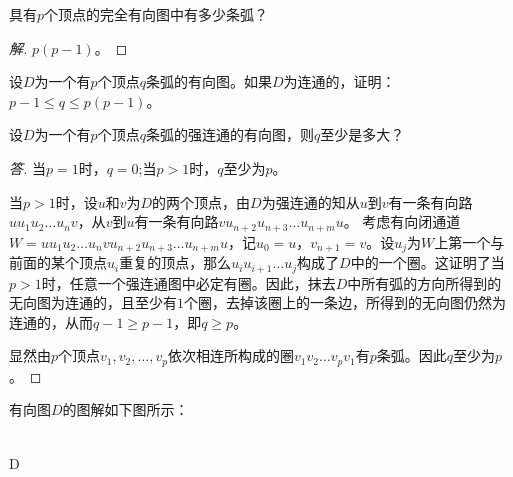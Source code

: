 \documentclass{article}
\begin{document}
\begin{CJK}{UTF8}{gbsn}
\begin{Exercise}
  具有$p$个顶点的完全有向图中有多少条弧？
\end{Exercise}
\begin{proof}[解]
  $p(p-1)$。
\end{proof}
\begin{Exercise}
  设$D$为一个有$p$个顶点$q$条弧的有向图。如果$D$为连通的，证明：$p-1\leq q \leq p(p-1)$。
\end{Exercise}
\begin{Exercise}
  设$D$为一个有$p$个顶点$q$条弧的强连通的有向图，则$q$至少是多大？
\end{Exercise}
\begin{proof}[答]
  当$p=1$时，$q=0$;当$p>1$时，$q$至少为$p$。

  当$p>1$时，设$u$和$v$为$D$的两个顶点，由$D$为强连通的知从$u$到$v$有一条有向路$uu_1u_2\ldots u_nv$，从$v$到$u$有一条有向路$vu_{n+2}u_{n+3}\ldots u_{n+m}u$。
  考虑有向闭通道$W=uu_1u_2\ldots u_nvu_{n+2}u_{n+3}\ldots u_{n+m}u$，记$u_0=u$，$v_{n+1}=v$。设$u_j$为$W$上第一个与前面的某个顶点$u_i$重复的顶点，那么$u_iu_{i+1}\ldots u_j$构成了$D$中的一个圈。这证明了当$p>1$时，任意一个强连通图中必定有圈。因此，抹去$D$中所有弧的方向所得到的无向图为连通的，且至少有$1$个圈，去掉该圈上的一条边，所得到的无向图仍然为连通的，从而$q-1\geq p-1$，即$q\geq p$。

  显然由$p$个顶点$v_1,v_2,\ldots,v_p$依次相连所构成的圈$v_1v_2\ldots v_pv_1$有$p$条弧。因此$q$至少为$p$。
 
\end{proof}

\begin{Exercise}
  有向图$D$的图解如下图所示：
  
  \centering
  \hspace{1cm}\\
 D


\end{Exercise}
\end{CJK}
\end{document}
